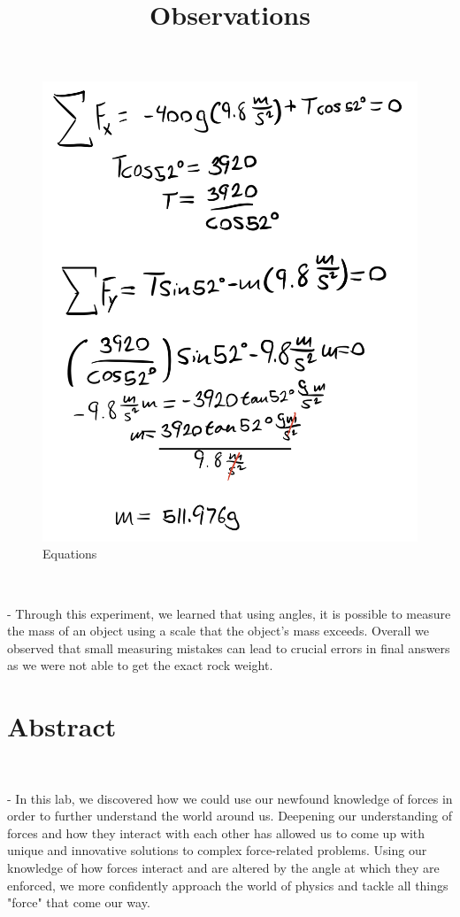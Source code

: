 \documentclass[letter paper, title page]{article}
\begin{document}
\begin{figure}[H]
    \centering
    \includegraphics[scale = 0.15]{4EQTNS.jpg}
    \caption{Equations}
    \label{fig:my_label}
\end{figure}

\noindent
\title{Observations}

\begin{list}
    \\\item - Through this experiment, we learned that using angles, it is possible to measure the mass of an object using a scale that the object's mass exceeds. Overall we observed that small measuring mistakes can lead to crucial errors in final answers as we were not able to get the exact rock weight. 
\end{list}

\newpage

\section*{\textbf{Abstract}}

\begin{list}
    \\\item - In this lab, we discovered how we could use our newfound knowledge of forces in order to further understand the world around us. Deepening our understanding of forces and how they interact with each other has allowed us to come up with unique and innovative solutions to complex force-related problems. Using our knowledge of how forces interact and are altered by the angle at which they are enforced, we more confidently approach the world of physics and tackle all things "force" that come our way.  
\end{list}
\end{document}
